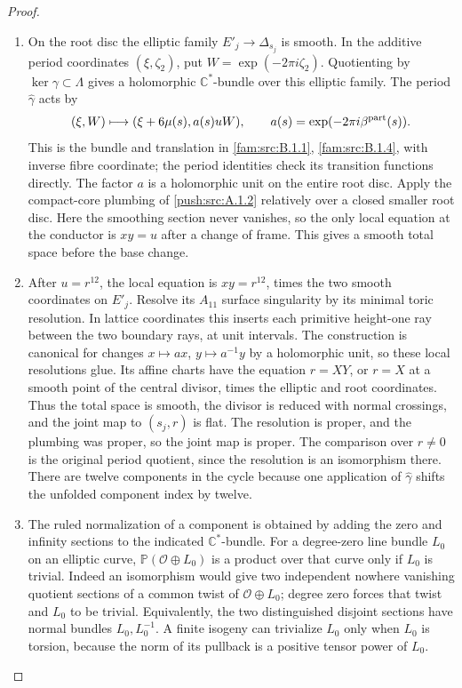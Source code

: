 \begin{proof}
\begin{enumerate}[label=\arabic*.,leftmargin=*]
\item On the root disc the elliptic family $E'_j\to\Delta_{s_j}$ is
smooth. In the additive period coordinates $(\xi,\zeta_2)$,
put $W=\exp(-2\pi i\zeta_2)$. Quotienting by
$\ker\gamma\subset\Lambda$ gives a holomorphic
$\mathbb C^*$-bundle over this elliptic family. The period
$\widehat\gamma$ acts by
\[
 (\xi,W)\longmapsto
 (\xi+6\mu(s),a(s)uW),\qquad
 a(s)=\exp(-2\pi i\beta^{\rm part}(s)).
\]
This is the bundle and translation in \cref{fam:src:B.1.1}, \cref{fam:src:B.1.4}, with inverse fibre
coordinate; the period identities check its transition
functions directly. The factor $a$ is a holomorphic unit on
the entire root disc. Apply the compact-core plumbing of
\ref{push:src:A.1.2} relatively over a closed smaller root disc. Here the
smoothing section never vanishes, so the only local equation
at the conductor is $xy=u$ after a change of frame. This
gives a smooth total space before the base change.

\item After $u=r^{12}$, the local equation is $xy=r^{12}$,
times the two smooth coordinates on $E'_j$. Resolve its
$A_{11}$ surface singularity by its minimal toric resolution.
In lattice coordinates this inserts each primitive height-one
ray between the two boundary rays, at unit intervals. The
construction is canonical for changes $x\mapsto a x$,
$y\mapsto a^{-1}y$ by a holomorphic unit, so these local
resolutions glue. Its affine charts have the equation
$r=XY$, or $r=X$ at a smooth point of the central divisor,
times the elliptic and root coordinates. Thus the total space
is smooth, the divisor is reduced with normal crossings, and
the joint map to $(s_j,r)$ is flat. The resolution is proper,
and the plumbing was proper, so the joint map is proper.
The comparison over $r\ne0$ is the original period quotient,
since the resolution is an isomorphism there. There are
twelve components in the cycle because one application of
$\widehat\gamma$ shifts the unfolded component index by
twelve.

\item The ruled normalization of a component is obtained by adding
the zero and infinity sections to the indicated
$\mathbb C^*$-bundle. For a degree-zero line bundle $L_0$
on an elliptic curve, $\mathbb P(\mathcal O\oplus L_0)$
is a product over that curve only if $L_0$ is trivial.
Indeed an isomorphism would give two independent nowhere
vanishing quotient sections of a common twist of
$\mathcal O\oplus L_0$; degree zero forces that twist and
$L_0$ to be trivial. Equivalently, the two distinguished
disjoint sections have normal bundles $L_0,L_0^{-1}$.
A finite isogeny can trivialize $L_0$ only when $L_0$ is
torsion, because the norm of its pullback is a positive
tensor power of $L_0$.


\end{enumerate}
\end{proof}
